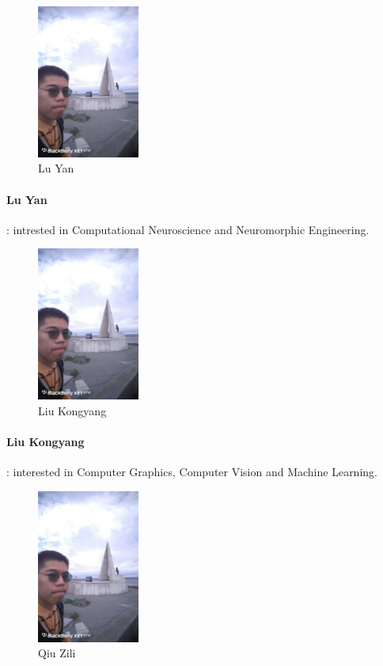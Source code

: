 \documentclass[a4paper, 11pt]{article}
\begin{document}
			\begin{figure}[H]
				\centering
				\includegraphics[width=0.3\textwidth]{Lu.jpg}
				\caption{Lu Yan} %
				\label{photo:1}  %
			\end{figure} 
			\paragraph{Lu Yan}: intrested in Computational Neuroscience and Neuromorphic Engineering.
			
			
			\begin{figure}[H]
				\centering
				\includegraphics[width=0.3\textwidth]{Lu.jpg}
				\caption{Liu Kongyang} %
				\label{photo:2}  %
			\end{figure} 
			\paragraph{Liu Kongyang}: interested in Computer Graphics, Computer Vision and Machine Learning.
			
			
			\begin{figure}[H]
				\centering
				\includegraphics[width=0.3\textwidth]{Lu.jpg}
				\caption{Qiu Zili} %
				\label{photo:3}  %
			\end{figure} 
\end{document}
